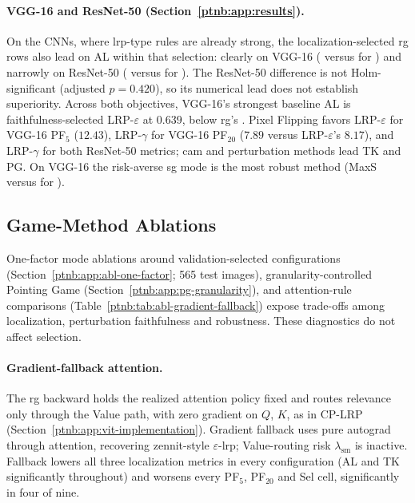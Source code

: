 \paragraph{VGG-16 and ResNet-50 (Section~\ref{ptnb:app:results}).}
On the CNNs, where \ac{lrp}-type rules are already strong, the localization-selected \ac{rg} rows also lead on AL within that selection: clearly on VGG-16 (\vggRGlocAL{} versus \vggBestBaseAL{} for \vggBestBaseALname{}) and narrowly on ResNet-50 (\resRGlocAL{} versus \resBestBaseAL{} for \resBestBaseALname{}). The ResNet-50 difference is not Holm-significant (adjusted $p=0.420$), so its numerical lead does not establish superiority. Across both objectives, VGG-16's strongest baseline AL is faithfulness-selected LRP-$\varepsilon$ at $0.639$, below \ac{rg}'s \vggRGlocAL{}. Pixel Flipping favors LRP-$\varepsilon$ for VGG-16 PF$_5$ ($12.43$), LRP-$\gamma$ for VGG-16 PF$_{20}$ ($7.89$ versus LRP-$\varepsilon$'s $8.17$), and LRP-$\gamma$ for both ResNet-50 metrics; \ac{cam} and perturbation methods lead TK and PG. On VGG-16 the risk-averse \ac{sg} mode is the most robust method (MaxS \vggSGlocMaxS{} versus \vggBestBaseMaxS{} for \vggBestBaseMaxSname{}).

\subsection{Game-Method Ablations}\label{subsec:mode_ablation}

One-factor mode ablations around validation-selected configurations (Section~\ref{ptnb:app:abl-one-factor}; 565 test images), granularity-controlled Pointing Game (Section~\ref{ptnb:app:pg-granularity}), and attention-rule comparisons (Table~\ref{ptnb:tab:abl-gradient-fallback}) expose trade-offs among localization, perturbation faithfulness and robustness. These diagnostics do not affect selection.

\paragraph{Gradient-fallback attention.}\label{ptnb:app:abl-gradient-fallback}

The \ac{rg} backward holds the realized attention policy fixed and routes relevance only through the Value path, with zero gradient on $Q$, $K$, as in CP-LRP~\parencite{Ali2022AttnLRP} (Section~\ref{ptnb:app:vit-implementation}). Gradient fallback uses pure autograd through attention, recovering zennit-style $\varepsilon$-\ac{lrp}; Value-routing risk $\lambda_\text{sm}$ is inactive. Fallback lowers all three localization metrics in every configuration (AL and TK significantly throughout) and worsens every PF$_5$, PF$_{20}$ and Sel cell, significantly in four of nine.


